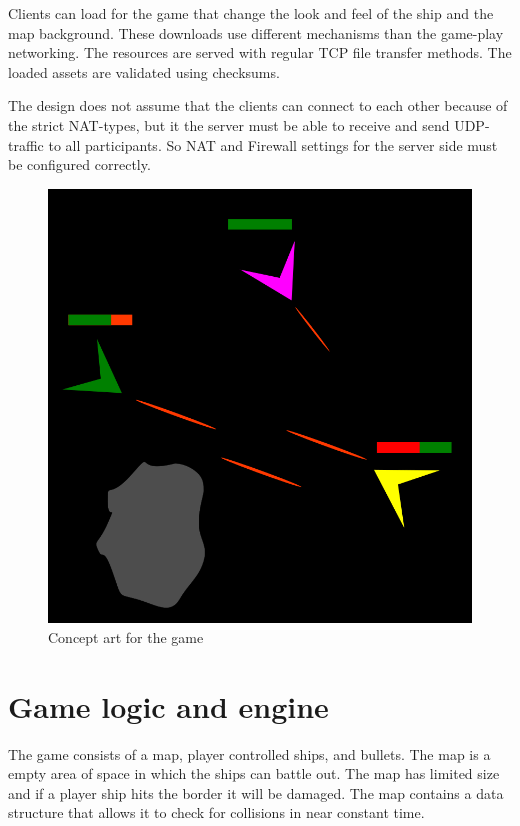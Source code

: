 \documentclass[10pt,a4paper]{article}
\begin{document}
 Clients can load for the game that change the look and feel of
 the ship and the map background. These downloads use different mechanisms than
 the game-play networking. The resources are served with regular TCP file
 transfer methods. The loaded assets are validated using checksums.

 The design does not assume that the clients can connect to each other
 because of the strict NAT-types, but it the server must be able to 
 receive and send UDP-traffic to all participants. So NAT and Firewall settings
 for the server side must be configured correctly.

 \begin{figure}
   \caption{Concept art for the game}
   \includegraphics[scale=0.4]{concept.png}
 \end{figure}

 \section{Game logic and engine}

 The game consists of a map, player controlled ships, and bullets.  The map is
 a empty area of space in which the ships can battle out. The map has limited
 size and if a player ship hits the border it will be damaged. The map contains
 a data structure that allows it to check for collisions in near constant time.
\end{document}
